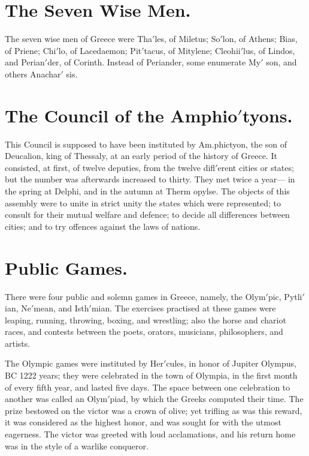 \documentclass[openany,a4paper]{memoir}
\begin{document}
\section{The Seven Wise Men.}

The seven wise men of Greece 
were Tha$'$les, of Miletus; So$'$lon, of Athens; Bias, of Priene; Chi$'$lo, of Lacedaemon; Pit$'$tacus, of Mitylene; Cleohii$'$lus, of Lindos, and Perian$'$der, of Corinth. Instead of 
Periander, some enumerate My$'$ son, and others Anachar$'$ sis. 

\section{The Council of the Amphio$'$tyons.}

This Council is supposed to have been instituted by Am.phictyon, the son of 
Deucalion, king of Thessaly, at an early period of the history of Greece. It consisted, at first, of twelve deputies, 
from the twelve difl$'$erent cities or states; but the number 
was afterwards increased to thirty. They met twice a year---
in the spring at Delphi, and in the autumn at Therm opylse. 
The objects of this assembly were to unite in strict unity the 
states which were represented; to consult for their mutual 
welfare and defence; to decide all differences between cities; 
and to try offences against the laws of nations. 

\section{Public Games.}

There were four public and solemn games 
in Greece, namely, the Olym$'$pic, Pytli$'$ian, Ne$'$mean, and 
Isth$'$mian. The exercises practised at these games were 
leaping, running, throwing, boxing, and wrestling; also the 
horse and chariot races, and contests between the poets, orators, musicians, philosophers, and artists. 

The Olympic games were instituted by Her$'$cules, in honor 
of Jupiter Olympus, BC 1222 years; they were celebrated 
in the town of Olympia, in the first month of every fifth year, 
and lasted five days. The space between one celebration to 
another was called an Olym$'$piad, by which the Greeks computed their time. The prize bestowed on the victor was a 
crown of olive; yet trifling as was this reward, it was considered as the highest honor, and was sought for with the 
utmost eagerness. The victor was greeted with loud acclamations, and his return home was in the style of a warlike 
conqueror. 
\end{document}
